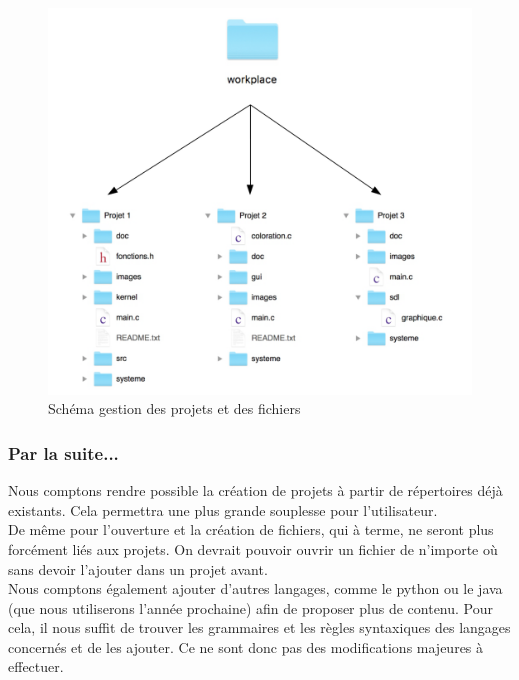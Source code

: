 \documentclass[a4paper,12pt]{article}
\begin{document}
		\begin{figure}[h!]
			\begin{center}
				\includegraphics[scale=0.5]{images/nav_fic}
				\caption{Schéma gestion des projets et des fichiers}
			\end{center}
		\end{figure}
		
		\newpage
			
		\subsubsection*{Par la suite...}
		
				Nous comptons rendre possible la création de projets à partir de répertoires déjà existants. Cela permettra une plus grande souplesse pour l'utilisateur.\\
				De même pour l'ouverture et la création de fichiers, qui à terme, ne seront plus forcément liés aux projets. On devrait pouvoir ouvrir un fichier de n'importe où sans devoir l'ajouter dans un projet avant.\\
				
				Nous comptons également ajouter d'autres langages, comme le python ou le java (que nous utiliserons l'année prochaine) afin de proposer plus de contenu. Pour cela, il nous suffit de trouver les grammaires et les règles syntaxiques des langages concernés et de les ajouter. Ce ne sont donc pas des modifications majeures à effectuer.
			
\end{document}
